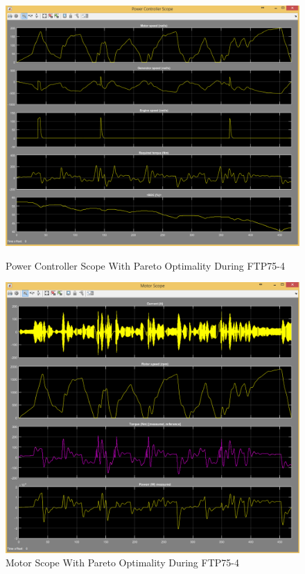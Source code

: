 \begin{figure}[hp]
\centering
\includegraphics[scale=0.45]{figures/Pareto/FTP75-4/powerController05Juli}
\caption{Power Controller Scope With Pareto Optimality During FTP75-4}
\label{fig:pcpo4}
\includegraphics[scale=0.48]{figures/Pareto/FTP75-4/motor05Juli}
\caption{Motor Scope With Pareto Optimality During FTP75-4}
\label{fig:mpo4}
\end{figure}

